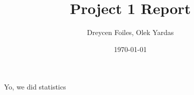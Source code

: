 \documentclass{article}
\title{Project 1 Report}
\author{Dreycen Foiles, Olek Yardas}
\date{\today}
\begin{document}
\maketitle

Yo, we did statistics
\end{document}

